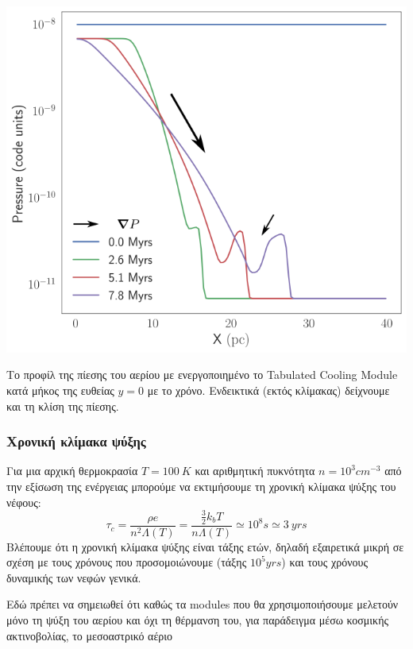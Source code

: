 	
	\begin{marginfigure}
	\includegraphics[width=1\linewidth]{DataImages/TabCoolingPRSprofile-gradP}
	\caption{Το προφίλ της πίεσης του αερίου με ενεργοποιημένο το Tabulated Cooling Module κατά μήκος της ευθείας $y=0$ με το χρόνο. Ενδεικτικά (εκτός κλίμακας) δείχνουμε και τη κλίση της πίεσης.}
	\label{fig:tabcoolingprsprofile-gradp}
\end{marginfigure}

	
	
	\subsubsection{Χρονική κλίμακα ψύξης}
	Για μια αρχική θερμοκρασία $T=\SI{100}{K}$ και αριθμητική πυκνότητα $n=10^3\si{cm^{-3}}$ από την εξίσωση της ενέργειας μπορούμε να εκτιμήσουμε τη χρονική κλίμακα ψύξης του νέφους:
	\begin{equation}
		\tau _c =\frac{ \rho e} {n^2 \Lambda (T)}=
		\frac{ \frac{3}{2}k_b T} {n \Lambda (T)} 
		\simeq 10^8\si{s}\simeq \SI{3}{yrs}
	\end{equation}
	Βλέπουμε ότι η χρονική κλίμακα ψύξης είναι τάξης ετών, δηλαδή εξαιρετικά μικρή σε σχέση με τους χρόνους που προσομοιώνουμε (τάξης $10^5\si{yrs}$) και τους χρόνους δυναμικής των νεφών γενικά.
	
	Εδώ πρέπει να σημειωθεί ότι καθώς τα modules που θα χρησιμοποιήσουμε μελετούν μόνο τη ψύξη του αερίου και όχι τη θέρμανση του, για παράδειγμα μέσω κοσμικής ακτινοβολίας, το μεσοαστρικό αέριο 
	
